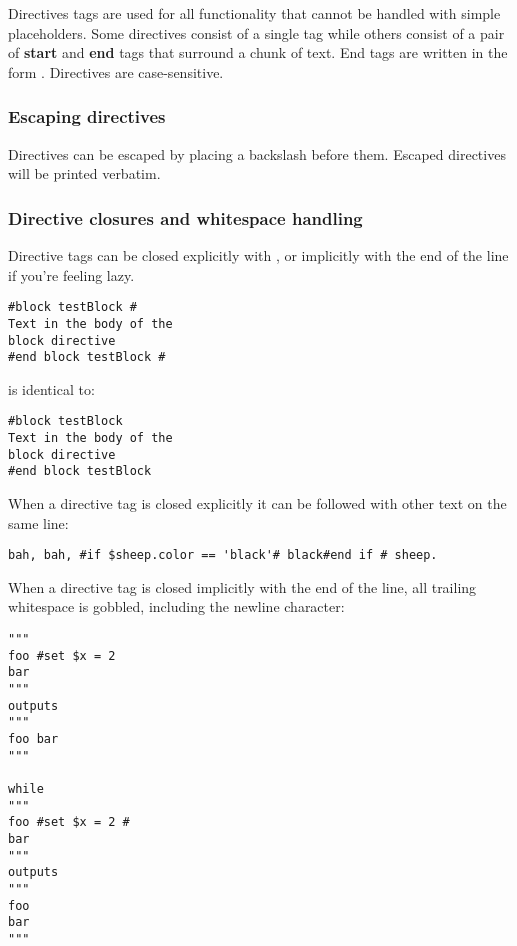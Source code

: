 Directives tags are used for all functionality that cannot be handled with
simple placeholders. Some directives consist of a single tag while others
consist of a pair of {\bf start} and {\bf end} tags that surround a chunk of
text.  End tags are written in the form .
Directives are case-sensitive.

\subsubsection{Escaping directives}
\label{language.directives.escaping}

Directives can be escaped by placing a backslash before them.  Escaped
directives will be printed verbatim.

\subsubsection{Directive closures and whitespace handling}
\label{language.directives.closures}
Directive tags can be closed explicitly with \code{\#}, or implicitly with the
end of the line if you're feeling lazy.

\begin{verbatim}
#block testBlock #
Text in the body of the
block directive
#end block testBlock #
\end{verbatim}
is identical to:
\begin{verbatim}
#block testBlock
Text in the body of the
block directive
#end block testBlock
\end{verbatim}

When a directive tag is closed explicitly it can be followed with other text on
the same line:

\begin{verbatim}
bah, bah, #if $sheep.color == 'black'# black#end if # sheep.
\end{verbatim}

When a directive tag is closed implicitly with the end of the line, all trailing
whitespace is gobbled, including the newline character:
\begin{verbatim}
"""
foo #set $x = 2 
bar
"""
outputs 
"""
foo bar
"""

while 
"""
foo #set $x = 2 #
bar
"""
outputs 
"""
foo 
bar
"""
\end{verbatim}

